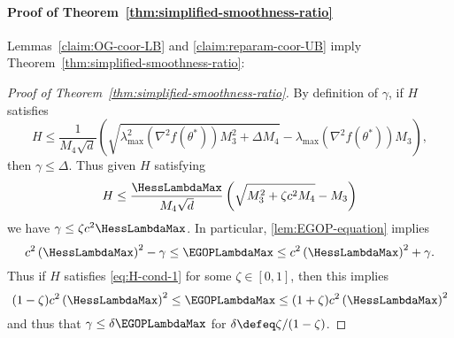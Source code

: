\paragraph{Proof of Theorem~\ref{thm:simplified-smoothness-ratio}} Lemmas~\ref{claim:OG-coor-LB} and \ref{claim:reparam-coor-UB} imply Theorem~\ref{thm:simplified-smoothness-ratio}:
\begin{proof}[Proof of Theorem~\ref{thm:simplified-smoothness-ratio}]    
    By definition of $\gamma$, if $H$ satisfies
    \[
        H\leq \frac{1}{M_4 \sqrt{d}}\left(\sqrt{\lambda^2_{\max}(\nabla^2 f(\theta^*)) M_3^2 + \Delta M_4} - \lambda_{\max}(\nabla^2 f(\theta^*)) M_3\right),
    \]
    then $\gamma\leq \Delta$. Thus given $H$ satisfying
    \begin{equation}\label{eq:H-cond-1}
        H\leq \frac{\HessLambdaMax}{M_4 \sqrt{d}}\left(\sqrt{M_3^2 + \zeta c^2 M_4} -  M_3\right)
    \end{equation}
    we have $\gamma \leq \zeta c^2 \HessLambdaMax$. In particular, \cref{lem:EGOP-equation} implies
    \[
        c^2 \left(\HessLambdaMax\right)^2 -\gamma \leq \EGOPLambdaMax \leq c^2 \left(\HessLambdaMax\right)^2 +\gamma. 
    \]
    Thus if $H$ satisfies \cref{eq:H-cond-1} for some $\zeta \in [0,1]$, then this implies
    \[
        (1-\zeta)c^2 \left(\HessLambdaMax\right)^2 \leq \EGOPLambdaMax \leq (1+\zeta)c^2 \left(\HessLambdaMax\right)^2
    \]
    and thus that $\gamma \leq \delta \EGOPLambdaMax$ for $\delta \defeq \zeta/(1-\zeta)$.


\end{proof}
